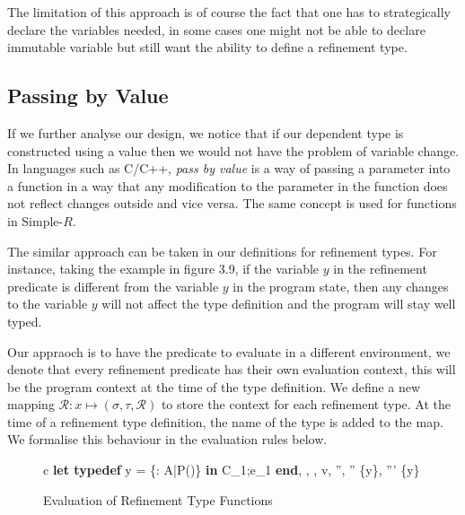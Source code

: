 \documentclass[a4paper,12pt]{report}
\begin{document}
\par
The limitation of this approach is of course the fact that one has to strategically 
declare the variables needed, in some cases one might not be able to declare 
immutable variable but still want the ability to define a refinement type.

\subsection{Passing by Value}

If we further analyse our design, we notice that if our dependent type is 
constructed using a value then we would not have the problem of variable change. 
In languages such as C/C++, \textit{pass by value} \cite{pbv} is a way of 
passing a parameter into a function in a way that any modification to the 
parameter in the function does not reflect changes outside and vice versa. The 
same concept is used for functions in Simple-$R$.

\par
The similar approach can be taken in our definitions for refinement types. For 
instance, taking the example in figure 3.9, if the variable $y$ in the refinement  
predicate is different from the variable $y$ in the program state, then any 
changes to the variable $y$ will not affect the type definition and the program 
will stay well typed.

\par
Our appraoch is to have the predicate to evaluate in a different environment, we 
denote that every refinement predicate has their own evaluation context, this 
will be the program context at the time of the type definition. We define a new 
mapping $\mathcal{R}: x \mapsto (\sigma, \tau, \mathcal{R})$ to store the context for each refinement 
type. At the time of a refinement type definition, the name of the type is added 
to the map. We formalise this behaviour in the evaluation rules below.

\begin{figure}[H]
  \begin{center}
    \begin{tabular} {c}
      \footnotesize
      {\langle\textbf{let typedef } y = \{\upsilon : A\text{ }|\text{ }P(\upsilon)\} \textbf{ in }C_1;e_1\textbf{ end}, 
      \sigma, \tau,  \rangle \Longrightarrow \langle v, \sigma'', \tau'' \setminus \{y\}, ''' \setminus \{y\} \rangle} 
      \normalsize
    \end{tabular}
  \end{center}
  \caption{Evaluation of Refinement Type Functions}
\end{figure}
\end{document}

